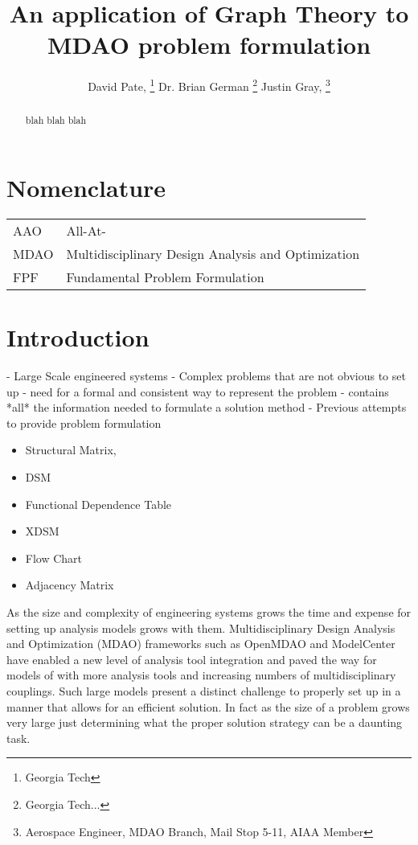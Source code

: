 \documentclass[]{aiaa-tc} %
\title{An application of Graph Theory to MDAO problem formulation}
\author{
  David Pate, %
     \thanks{Georgia Tech}
  Dr. Brian German 
     \thanks{Georgia Tech...}
  Justin Gray,%
     \thanks{Aerospace Engineer, MDAO Branch, Mail Stop 5-11, AIAA Member}   
 }
\begin{document}
\maketitle
 
\begin{abstract}
   blah blah blah
\end{abstract}

\section*{Nomenclature}

\begin{tabular}{l l} 
    AAO      & All-At- \\
    MDAO     & Multidisciplinary Design Analysis and Optimization \\
    FPF      & Fundamental Problem Formulation \\
\end{tabular}


\section{Introduction}
    
    - Large Scale engineered systems 
    - Complex problems that are not obvious to set up
    - need for a formal and consistent way to represent the problem
      - contains *all* the information needed to formulate a solution method
    - Previous attempts to provide problem formulation
 
      \begin{itemize}
        \item Structural Matrix, 
        \item DSM
        \item Functional Dependence Table
        \item XDSM
        \item Flow Chart
        \item Adjacency Matrix
      \end{itemize}

    As the size and complexity of engineering systems grows the time and expense for setting up 
    analysis models grows with them. Multidisciplinary Design Analysis and Optimization (MDAO)
    frameworks such as OpenMDAO\cite{Gray2012} and ModelCenter have enabled a new level of analysis tool integration 
    and paved the way for models of with more analysis tools and increasing numbers of multidisciplinary couplings. 
    Such large models present a distinct challenge to properly set up in a manner that allows for an efficient solution. 
    In fact as the size of a problem grows very large just determining what the proper solution strategy can be a daunting 
    task. 
\end{document}
